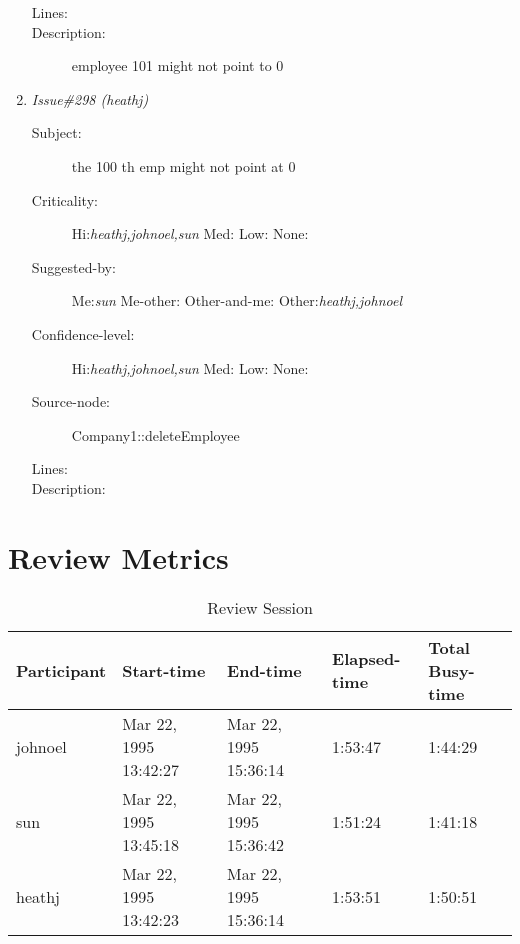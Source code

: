 \begin{enumerate}
\begin{description}
\item [Lines:] 

\item [Description:] employee 101 might not point to 0
\end{description}
\item {\it Issue\#298 (heathj)}
\begin{description}
\item [Subject:] the 100 th emp might not point at 0
\item [Criticality:] Hi:{\it heathj,johnoel,sun} Med:{\it } Low:{\it } None:{\it }
\item [Suggested-by:] Me:{\it sun} Me-other:{\it } Other-and-me:{\it } Other:{\it heathj,johnoel}
\item [Confidence-level:] Hi:{\it heathj,johnoel,sun} Med:{\it } Low:{\it } None:{\it }
\item [Source-node:] Company1::deleteEmployee

\item [Lines:] 

\item [Description:] 
\end{description}
\end{enumerate}
\section{Review Metrics}
\begin{table}[hb]
\begin{center}
\begin{tabular}{|l|l|l|l|l|}
\hline
Participant & Start-time & End-time & Elapsed-time & Total Busy-time \\
\hline
johnoel & Mar 22, 1995 13:42:27 & Mar 22, 1995 15:36:14 & 1:53:47 & 1:44:29 \\
sun & Mar 22, 1995 13:45:18 & Mar 22, 1995 15:36:42 & 1:51:24 & 1:41:18 \\
heathj & Mar 22, 1995 13:42:23 & Mar 22, 1995 15:36:14 & 1:53:51 & 1:50:51 \\
\hline
\end{tabular}
\end{center}
\caption{Review Session}
\end{table}


